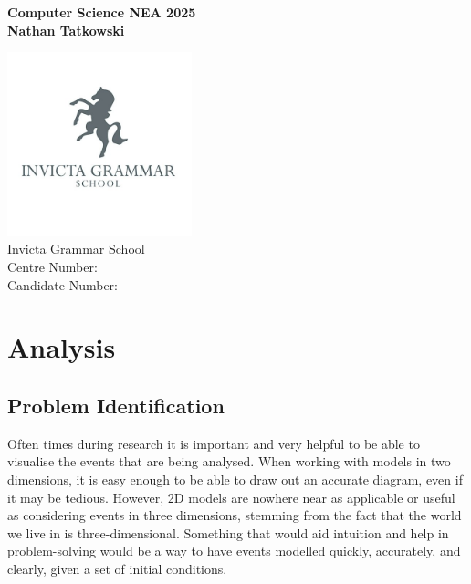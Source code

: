 \documentclass[11pt]{article}
\begin{document}
    \pagestyle{fancy}
    \setlength{\headheight}{13.6pt}

    \begin{titlepage}
        \begin{center}
            \vspace*{1cm}
            \Huge
            \textbf{Computer Science NEA 2025} \\
            \vspace*{2cm}
            \LARGE
            \textbf{Nathan Tatkowski}

            \vfill
            \includegraphics*[width=0.4\textwidth]{figures/igsLogo.jpg} \\
            \Large
            Invicta Grammar School \\
            Centre Number: \\
            Candidate Number: 
        \end{center}
    \end{titlepage}

    \tableofcontents
    \pagebreak


    \section{Analysis}
        \subsection{Problem Identification}
            Often times during research it is important and very helpful to be able to visualise the events that are being analysed. When working with models in two dimensions, it is easy enough to be able to draw out an accurate diagram, even if it may be tedious. However, 2D models are nowhere near as applicable or useful as considering events in three dimensions, stemming from the fact that the world we live in is three-dimensional. Something that would aid intuition and help in problem-solving would be a way to have events modelled quickly, accurately, and clearly, given a set of initial conditions.
\end{document}
